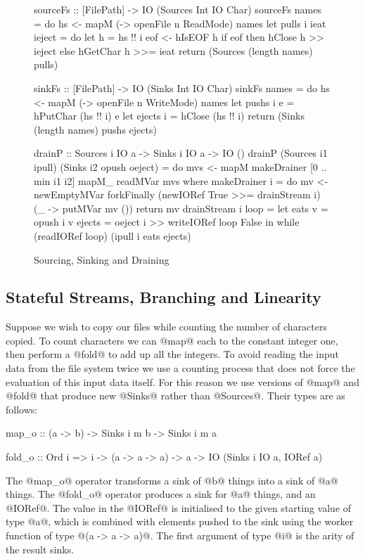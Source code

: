 \begin{figure}
\begin{code}
sourceFs :: [FilePath] -> IO (Sources Int IO Char)
sourceFs names 
 = do hs <- mapM (\n -> openFile n ReadMode) names
      let pulls i ieat ieject
          = do let h = hs !! i
               eof <- hIsEOF h
               if eof then hClose   h >> ieject
                      else hGetChar h >>= ieat
      return (Sources (length names) pulls)

sinkFs  :: [FilePath] -> IO (Sinks Int IO Char)
sinkFs names 
 = do hs <- mapM (\n -> openFile n WriteMode) names
      let pushs  i e = hPutChar (hs !! i) e
      let ejects i   = hClose   (hs !! i)
      return (Sinks (length names) pushs ejects)

drainP :: Sources i IO a -> Sinks i IO a -> IO ()
drainP (Sources i1 ipull) (Sinks i2 opush oeject)
 = do mvs <- mapM makeDrainer [0 .. min i1 i2]
      mapM_ readMVar mvs
 where
  makeDrainer i = do
    mv <- newEmptyMVar
    forkFinally (newIORef True >>= drainStream i)
                (\_ -> putMVar mv ())
    return mv
  drainStream i loop =
    let eats v = opush i v
        ejects = oeject i >> writeIORef loop False
    in  while (readIORef loop) (ipull i eats ejects)
\end{code}

\caption{Sourcing, Sinking and Draining}
\label{f:Draining}
\end{figure}


\vspace{-1em}
\subsection{Stateful Streams, Branching and Linearity}
\label{s:Linearity}
Suppose we wish to copy our files while counting the number of characters copied.
To count characters we can @map@ each to the constant integer one, then perform a @fold@ to add up all the integers. To avoid reading the input data from the file system twice we use a counting process that does not force the evaluation of this input data itself. For this reason we use versions of @map@ and @fold@ that produce new @Sinks@ rather than @Sources@. Their types are as follows:
\begin{code}
map_o  :: (a -> b) -> Sinks i m b -> Sinks i m a

fold_o :: Ord i => i -> (a -> a -> a) -> a
                -> IO (Sinks i IO a, IORef a)
\end{code}
The @map_o@ operator transforms a sink of @b@ things into a sink of @a@ things. The @fold_o@ operator produces a sink for @a@ things, and an @IORef@. The value in the @IORef@ is initialised to the given starting value of type @a@, which is combined with elements pushed to the sink using the worker function of type @(a -> a -> a)@. The first argument of type @i@ is the arity of the result sinks. 

